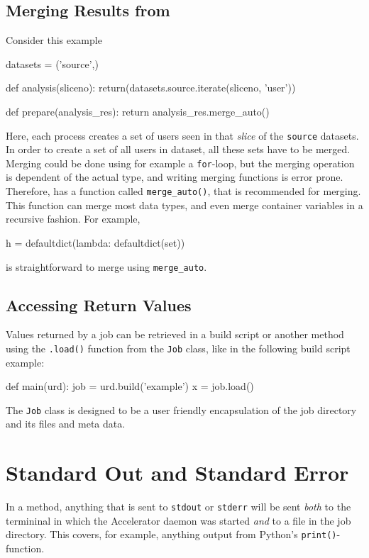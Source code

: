 \subsection{Merging Results from \analysis}
Consider this example
\begin{python}
datasets = ('source',)
  
def analysis(sliceno):
    return(datasets.source.iterate(sliceno, 'user'))

def prepare(analysis_res):
    return analysis_res.merge_auto()
\end{python}
Here, each \analysis process creates a set of users seen in that
\textsl{slice} of the \texttt{source} datasets.  In order to create a
set of all users in dataset, all these sets have to be merged.
Merging could be done using for example a \texttt{for}-loop, but the
merging operation is dependent of the actual type, and writing merging
functions is error prone.  Therefore, \analysisres has a function
called \texttt{merge\_auto()}, that is recommended for merging.  This
function can merge most data types, and even merge container variables
in a recursive fashion.  For example,
\begin{python}
h = defaultdict(lambda: defaultdict(set))
\end{python}
is straightforward to merge using \texttt{merge\_auto}.



\subsection{Accessing Return Values}
Values returned by a job can be retrieved in a build script or another
method using the \texttt{.load()} function from the \texttt{Job}
class, like in the following build script example:
\begin{python}
def main(urd):
    job = urd.build('example')
    x = job.load()
\end{python}
The \texttt{Job} class is designed to be a user friendly encapsulation
of the job directory and its files and meta data.



\section{Standard Out and Standard Error}
\label{sec:OUTPUT}

In a method, anything that is sent to \texttt{stdout} or
\texttt{stderr} will be sent \textsl{both} to the termininal in which
the Accelerator daemon was started \textsl{and} to a file in the job
directory.  This covers, for example, anything output from Python's
\texttt{print()}-function.

